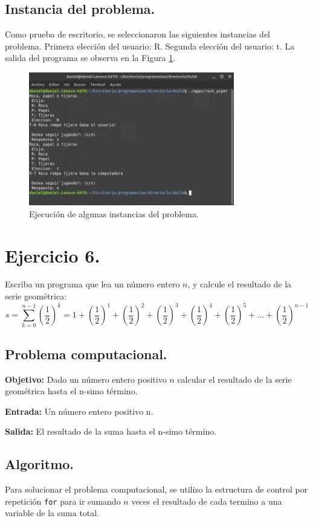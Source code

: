 \documentclass[12pt,letterpaper]{article}
\begin{document}
\subsection{Instancia del problema.}
Como prueba de escritorio, se seleccionaron las siguientes instancias del problema. Primera elecci\'on del usuario: R. Segunda elecci\'on del usuario: t. La salida del programa se observa en la Figura \ref{fig:rock_piper}.
\begin{figure}[ht!]
  \centering
  \includegraphics[width=0.8\textwidth]{figures/rock_piper}
  \caption{Ejecución de algunas instancias del problema.}
  \label{fig:rock_piper}
\end{figure}
\newpage

\section{Ejercicio 6.}

Escriba un programa que lea un n\'umero entero $n$, y calcule el resultado de la serie geom\'etrica:
$$ s = \sum_{k=0}^{n-1}\left(\frac{1}{2}\right)^k = 1 + \left(\frac{1}{2}\right)^1 + \left(\frac{1}{2}\right)^2 + \left(\frac{1}{2}\right)^3 + \left(\frac{1}{2}\right)^4 + \left(\frac{1}{2}\right)^5 + ...  + \left(\frac{1}{2}\right)^{n-1} $$

\subsection{Problema computacional.}
\textbf{Objetivo:} Dado un n\'umero entero positivo $n$ calcular el resultado de la serie geom\'etrica hasta el n-simo t\'ermino.

\textbf{Entrada:} Un n\'umero entero positivo n.

\textbf{Salida:} El resultado de la suma hasta el n-simo t\'ermino.

\subsection{Algoritmo.}
Para solucionar el problema computacional, se utilizo la estructura de control por repetici\'on \texttt{for} para ir sumando $n$ veces el resultado de cada termino a una variable de la suma total.
\end{document}
